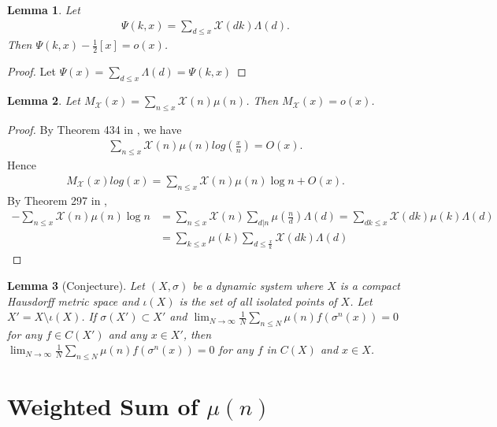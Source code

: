 \documentclass[a4paper,10pt]{amsart}
\newtheorem{lemma}{Lemma}[section]
\newcommand{\X}{\mathcal X}
\begin{document}
\begin{lemma}
    Let 
    \begin{align*}
        \Psi(k,x) = \sum_{d \leq x}\X(dk)\Lambda(d).
    \end{align*} 
    Then $\Psi(k,x) - \frac{1}{2}[x] = o(x)$.
\end{lemma}

\begin{proof}
   Let $\Psi(x) = \sum_{d \leq x}\Lambda(d) = \Psi(k,x)$ 
\end{proof}

\begin{lemma}
    Let $M_{\X}(x) = \sum_{n \leq x}\X(n)\mu(n)$. Then
    $M_{\X}(x) = o(x)$. 
\end{lemma}

\begin{proof}
    By Theorem 434 in \cite{HW}, we have
    \begin{align*}
        \sum_{n \leq x} \X(n)\mu(n)log(\frac{x}{n}) = O(x). 
    \end{align*}
    Hence
    \begin{align*}
        M_{\X}(x)log(x) = \sum_{n \leq x}\X(n)\mu(n)\log n + O(x).    
    \end{align*}
    By Theorem 297 in \cite{HW},
    \begin{align*}
        -\sum_{n \leq x}\X(n)\mu(n)\log n 
        &= \sum_{n \leq x}\X(n)\sum_{d | n}
        \mu(\frac{n}{d})\Lambda(d)
        = \sum_{dk \leq x}\X(dk)\mu(k)\Lambda(d)\\
        & = \sum_{k \leq x} \mu(k)\sum_{d \leq \frac{x}{k}}\X(dk)\Lambda(d)
    \end{align*}
\end{proof}

\begin{lemma}[Conjecture]
    Let $(X, \sigma)$ be a dynamic system where $X$ is a compact 
    Hausdorff metric space and $\iota(X)$ is the set of 
    all isolated points of $X$. Let $X' = X \setminus \iota(X)$. If
    $\sigma(X') \subset X'$ and $\lim_{N \rightarrow \infty}
       \frac{1}{N} \sum_{n \leq N}\mu(n)f(\sigma^{n}(x)) = 0$ for any
    $f \in C(X')$ and any $x \in X'$, then $\lim_{N \rightarrow \infty}
       \frac{1}{N} \sum_{n \leq N}\mu(n)f(\sigma^{n}(x)) = 0$ for any 
    $f$ in $C(X)$ and $x \in X$.
\end{lemma}

\section{Weighted Sum of $\mu(n)$}
\end{document}
